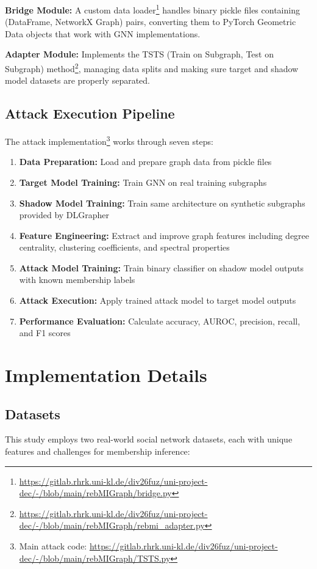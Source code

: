\documentclass{article}
\begin{document}
\textbf{Bridge Module:} A custom data loader\footnote{\url{https://gitlab.rhrk.uni-kl.de/div26fuz/uni-project-dec/-/blob/main/rebMIGraph/bridge.py}} handles binary pickle files containing (DataFrame, NetworkX Graph) pairs, converting them to PyTorch Geometric Data objects that work with GNN implementations.

\textbf{Adapter Module:} Implements the TSTS (Train on Subgraph, Test on Subgraph) method\footnote{\url{https://gitlab.rhrk.uni-kl.de/div26fuz/uni-project-dec/-/blob/main/rebMIGraph/rebmi_adapter.py}}, managing data splits and making sure target and shadow model datasets are properly separated.

\subsection{Attack Execution Pipeline}
The attack implementation\footnote{Main attack code: \url{https://gitlab.rhrk.uni-kl.de/div26fuz/uni-project-dec/-/blob/main/rebMIGraph/TSTS.py}} works through seven steps:
\begin{enumerate}
\item \textbf{Data Preparation:} Load and prepare graph data from pickle files
\item \textbf{Target Model Training:} Train GNN on real training subgraphs
\item \textbf{Shadow Model Training:} Train same architecture on synthetic subgraphs provided by DLGrapher
\item \textbf{Feature Engineering:} Extract and improve graph features including degree centrality, clustering coefficients, and spectral properties
\item \textbf{Attack Model Training:} Train binary classifier on shadow model outputs with known membership labels
\item \textbf{Attack Execution:} Apply trained attack model to target model outputs
\item \textbf{Performance Evaluation:} Calculate accuracy, AUROC, precision, recall, and F1 scores
\end{enumerate}

\section{Implementation Details}
\subsection{Datasets}
This study employs two real-world social network datasets, each with unique features and challenges for membership inference:
\end{document}
